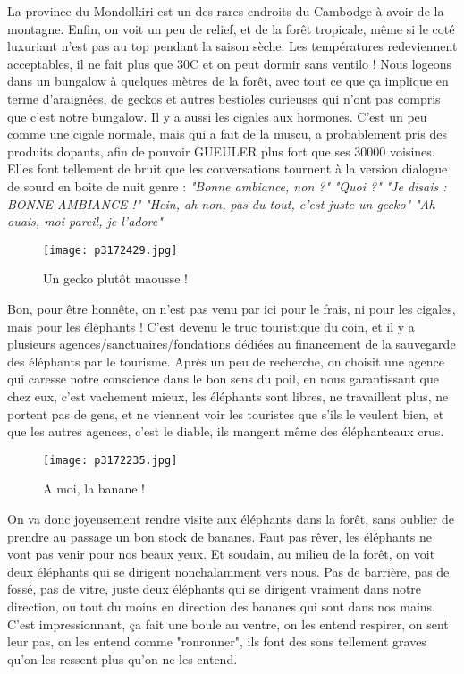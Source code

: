 \documentclass{book}
\begin{document}
La province du Mondolkiri est un des rares endroits du Cambodge à avoir de la montagne. Enfin, on voit un peu de relief, et de la forêt tropicale, même si le coté luxuriant n'est pas au top pendant la saison sèche. Les températures redeviennent acceptables, il ne fait plus que 30\textdegree C et on peut dormir sans ventilo ! Nous logeons dans un bungalow à quelques mètres de la forêt, avec tout ce que ça implique en terme d'araignées, de geckos et autres bestioles curieuses qui n'ont pas compris que c'est notre bungalow. Il y a aussi les cigales aux hormones. C'est un peu comme une cigale normale, mais qui a fait de la muscu, a probablement pris des produits dopants, afin de pouvoir GUEULER plus fort que ses 30000 voisines. Elles font tellement de bruit que les conversations tournent à la version dialogue de sourd en boite de nuit genre :
\emph{"Bonne ambiance, non ?"}
\emph{"Quoi ?"}
\emph{"Je disais : BONNE AMBIANCE !"}
\emph{"Hein, ah non, pas du tout, c'est juste un gecko"}
\emph{"Ah ouais, moi pareil, je l'adore"}


\begin{figure}[h]
\centering
\texttt{[image: p3172429.jpg]}
\caption*{Un gecko plutôt maousse !}
\end{figure}

Bon, pour être honnête, on n'est pas venu par ici pour le frais, ni pour les cigales, mais pour les éléphants ! C'est devenu le truc touristique du coin, et il y a plusieurs agences/sanctuaires/fondations dédiées au financement de la sauvegarde des éléphants par le tourisme. Après un peu de recherche, on choisit une agence qui caresse notre conscience dans le bon sens du poil, en nous garantissant que chez eux, c'est vachement mieux, les éléphants sont libres, ne travaillent plus, ne portent pas de gens, et ne viennent voir les touristes que s'ils le veulent bien, et que les autres agences, c'est le diable, ils mangent même des éléphanteaux crus.


\begin{figure}[h]
\centering
\texttt{[image: p3172235.jpg]}
\caption*{A moi, la banane !}
\end{figure}

On va donc joyeusement rendre visite aux éléphants dans la forêt, sans oublier de prendre au passage un bon stock de bananes. Faut pas rêver, les éléphants ne vont pas venir pour nos beaux yeux. Et soudain, au milieu de la forêt, on voit deux éléphants qui se dirigent nonchalamment vers nous. Pas de barrière, pas de fossé, pas de vitre, juste deux éléphants qui se dirigent vraiment dans notre direction, ou tout du moins en direction des bananes qui sont dans nos mains. C'est impressionnant, ça fait une boule au ventre, on les entend respirer, on sent leur pas, on les entend comme "ronronner", ils font des sons tellement graves qu'on les ressent plus qu'on ne les entend.
\end{document}
